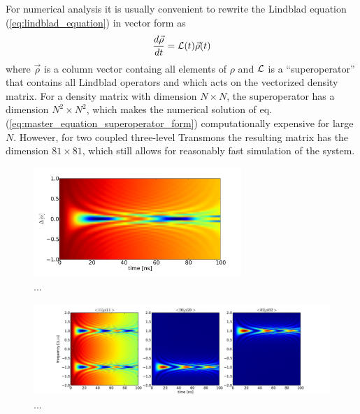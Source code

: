 For numerical analysis it is usually convenient to rewrite the Lindblad equation (\ref{eq:lindblad_equation}) in vector form as
%
\begin{equation}
\frac{d\vec{\rho}}{dt} = {\cal L}(t)\vec{\rho}(t) \label{eq:master_equation_superoperator_form}
\end{equation}
%
where $\vec{\rho}$ is a column vector containg all elements of $\rho$ and $\cal L$ is a ``superoperator'' that contains all Lindblad operators and which acts on the vectorized density matrix. For a density matrix with dimension $N\times N$, the superoperator has a dimension $N^2 \times N^2$, which makes the numerical solution of eq. (\ref{eq:master_equation_superoperator_form}) computationally expensive for large $N$. However, for two coupled three-level Transmons the resulting matrix has the dimension $81\times 81$, which still allows for reasonably fast simulation of the system.


\begin{figure}
	\centering
	\includegraphics[width=0.7\textwidth]{"./material/figures/appendix/modeling/master equation/swap_01_10_m1010"}
	\caption[...]{...}
	\label{fig:master_equation_simulation_swap_01_10_10}
\end{figure}

\begin{figure}[ht!]
	\centering
	\includegraphics[width=\textwidth]{"./material/figures/appendix/modeling/master equation/swap_11_02_20/swap_11_02_20"}
	\caption[...]{...}
	\label{fig:master_equation_simulation_swap_11_02_20}
\end{figure}

